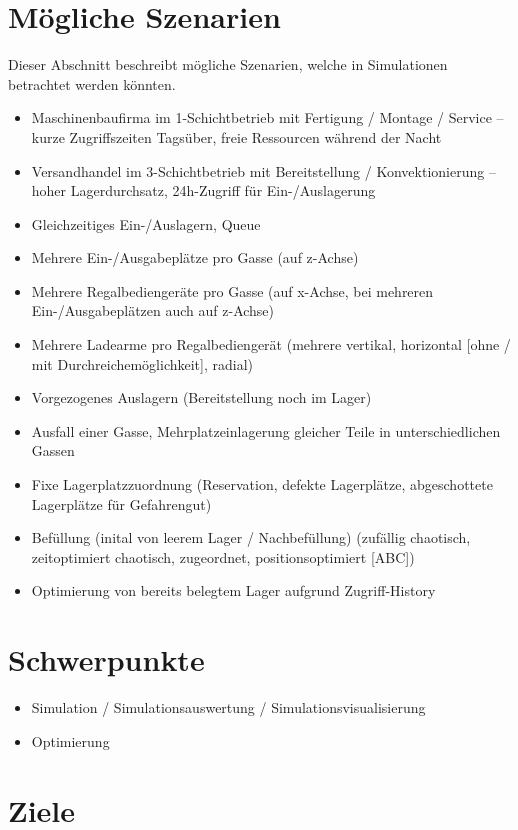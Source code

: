 \documentclass[11pt,a4paper]{article}
\begin{document}
\section{Mögliche Szenarien}\label{szenarien}
Dieser Abschnitt beschreibt mögliche Szenarien, welche in Simulationen betrachtet werden könnten.
%
\begin{itemize}
  \item Maschinenbaufirma im 1-Schichtbetrieb mit Fertigung / Montage / Service -- kurze Zugriffszeiten Tagsüber, freie Ressourcen während der Nacht
  \item Versandhandel im 3-Schichtbetrieb mit Bereitstellung / Konvektionierung --  hoher Lagerdurchsatz, 24h-Zugriff für Ein-/Auslagerung
  \item Gleichzeitiges Ein-/Auslagern, Queue
  \item Mehrere Ein-/Ausgabeplätze pro Gasse (auf z-Achse)
  \item Mehrere Regalbediengeräte pro Gasse (auf x-Achse, bei mehreren Ein-/Ausgabeplätzen auch auf z-Achse)
  \item Mehrere Ladearme pro Regalbediengerät (mehrere vertikal, horizontal [ohne / mit Durchreichemöglichkeit], radial)
  \item Vorgezogenes Auslagern (Bereitstellung noch im Lager)
  \item Ausfall einer Gasse, Mehrplatzeinlagerung gleicher Teile in unterschiedlichen Gassen
  \item Fixe Lagerplatzzuordnung (Reservation, defekte Lagerplätze, abgeschottete Lagerplätze für Gefahrengut)
  \item Befüllung (inital von leerem Lager / Nachbefüllung) (zufällig chaotisch, zeitoptimiert chaotisch, zugeordnet, positionsoptimiert [ABC])
  \item Optimierung von bereits belegtem Lager aufgrund Zugriff-History
\end{itemize}
%
\section{Schwerpunkte}
\begin{itemize}
  \item Simulation / Simulationsauswertung / Simulationsvisualisierung
  \item Optimierung
\end{itemize}
%
\section{Ziele}
%
\end{document}
